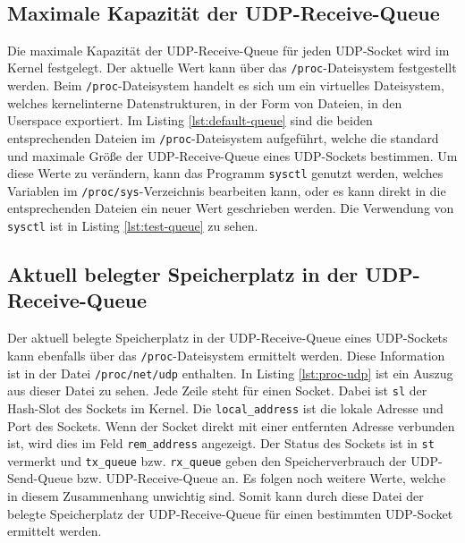 \documentclass[a4paper, 12pt, BCOR10mm, DIV12, toc=bibliography, toc=listof, german]{scrbook}
\begin{document}
		$~$\\
		\subsection*{Maximale Kapazität der UDP-Receive-Queue} %

		
		

		Die maximale Kapazität der UDP-Receive-Queue für jeden UDP-Socket wird im Kernel festgelegt. Der
		aktuelle Wert kann über das \texttt{/proc}-Dateisystem festgestellt werden. Beim
		\texttt{/proc}-Dateisystem \cite{benvenuti2005} handelt es sich um ein virtuelles Dateisystem,
		welches kernelinterne Datenstrukturen, in der Form von Dateien, in den Userspace exportiert. Im
		Listing \ref{lst:default-queue} sind die beiden entsprechenden Dateien im
		\texttt{/proc}-Dateisystem aufgeführt, welche die standard und maximale Größe der
		UDP-Receive-Queue eines UDP-Sockets bestimmen. Um diese Werte zu verändern, kann das Programm
		\texttt{sysctl} genutzt werden, welches Variablen im \texttt{/proc/sys}-Verzeichnis bearbeiten
		kann, oder es kann direkt in die entsprechenden Dateien ein neuer Wert geschrieben werden. Die
		Verwendung von \texttt{sysctl} ist in Listing \ref{lst:test-queue} zu sehen.

		\subsection*{Aktuell belegter Speicherplatz in der UDP-Receive-Queue} %

		Der aktuell belegte Speicherplatz in der UDP-Receive-Queue eines UDP-Sockets kann ebenfalls über
		das \texttt{/proc}-Dateisystem ermittelt werden. Diese Information ist in der Datei
		\texttt{/proc/net/udp} enthalten. In Listing \ref{lst:proc-udp} ist ein Auszug aus dieser Datei
		zu sehen. Jede Zeile steht für einen Socket. Dabei ist \texttt{sl} der Hash-Slot des Sockets im
		Kernel. Die \texttt{local\_address} ist die lokale Adresse und Port des Sockets. Wenn der Socket
		direkt  mit einer entfernten Adresse verbunden ist, wird dies im Feld \texttt{rem\_address} angezeigt.
		Der Status des Sockets ist in \texttt{st} vermerkt und \texttt{tx\_queue} bzw.
		\texttt{rx\_queue} geben den Speicherverbrauch der UDP-Send-Queue bzw. UDP-Receive-Queue an. Es
		folgen noch weitere Werte, welche in diesem Zusammenhang unwichtig sind. Somit kann durch diese
		Datei der belegte Speicherplatz der UDP-Receive-Queue für einen bestimmten UDP-Socket ermittelt werden.
\end{document}

